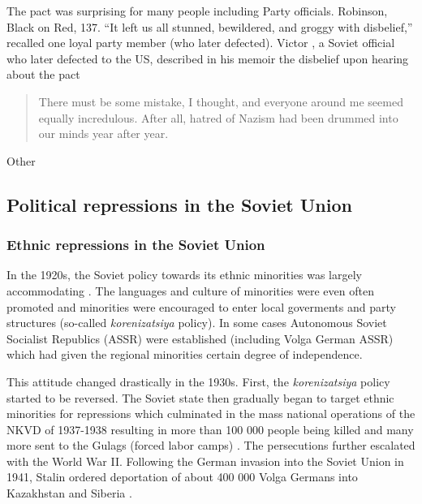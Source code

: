 The pact was surprising for many people including Party officials. 
Robinson, Black on Red, 137. “It left us all stunned, bewildered, and groggy with disbelief,” recalled one loyal party member (who later defected). 
Victor  \citet[p. 332]{kravchenko_i_1947}, a Soviet official who later defected to the US,   described in  his memoir the disbelief upon hearing about the pact  

\begin{quote}
There must be some mistake, I thought, and everyone around me seemed equally incredulous. After all, hatred of Nazism had been drummed into our minds year after year.    

\end{quote}

Other 

\subsection{Political repressions in the Soviet Union}

\subsubsection{Ethnic repressions in the Soviet Union}
In the 1920s, the Soviet policy towards its ethnic minorities was largely accommodating \citep{martin_affirmative_2001}. The languages and culture of minorities were even often promoted and minorities were encouraged to enter local goverments and party structures (so-called \emph{korenizatsiya} policy). In some cases Autonomous Soviet Socialist Republics (ASSR) were established (including Volga German ASSR) which had given the regional minorities certain degree of independence.  

This attitude changed drastically in the 1930s. First, the  \emph{korenizatsiya} policy started to be reversed. The Soviet state then gradually  began to target ethnic minorities for repressions  which culminated in the mass national operations of the NKVD of 1937-1938 resulting in more than 100 000 people being killed and many more sent to the Gulags (forced labor camps) \citep{martin_origins_1998, gregory_terror_2009, snyder_bloodlands:_2011}. 
The persecutions  further escalated with the World War II. Following the German invasion into the Soviet Union in 1941, Stalin ordered deportation of about 400 000 Volga Germans into Kazakhstan and Siberia \citep{polian_against_2003}.